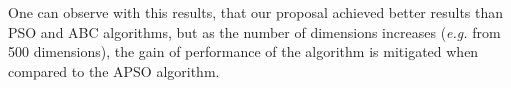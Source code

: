 One can observe with this results, that our proposal achieved better results than PSO and ABC algorithms, but as the number of dimensions increases (\textit {e.g.} from 500 dimensions), the gain of performance of the algorithm is mitigated when compared to the APSO algorithm. %

%
